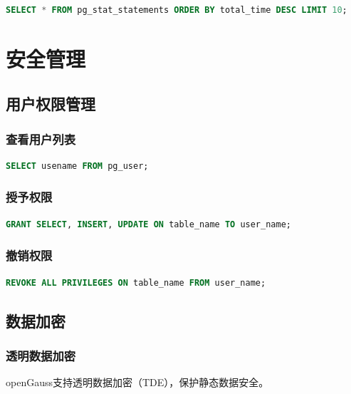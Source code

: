 \documentclass[12pt,UTF8]{ctexbook}
\begin{document}
\begin{lstlisting}[language=sql, caption=查询慢查询日志]
SELECT * FROM pg_stat_statements ORDER BY total_time DESC LIMIT 10;
\end{lstlisting}

\chapter{安全管理}

\section{用户权限管理}

\subsection{查看用户列表}

\begin{lstlisting}[language=sql, caption=查看所有用户]
SELECT usename FROM pg_user;
\end{lstlisting}

\subsection{授予权限}

\begin{lstlisting}[language=sql, caption=授予用户权限]
GRANT SELECT, INSERT, UPDATE ON table_name TO user_name;
\end{lstlisting}

\subsection{撤销权限}

\begin{lstlisting}[language=sql, caption=撤销用户权限]
REVOKE ALL PRIVILEGES ON table_name FROM user_name;
\end{lstlisting}

\section{数据加密}

\subsection{透明数据加密}

openGauss支持透明数据加密（TDE），保护静态数据安全。
\end{document}
